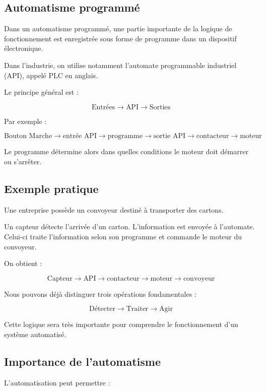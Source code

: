 \documentclass[12pt,a4paper]{book}
\begin{document}
\subsection{Automatisme programmé}

Dans un automatisme programmé, une partie importante de la logique de fonctionnement est enregistrée sous forme de programme dans un dispositif électronique.

Dans l'industrie, on utilise notamment l'automate programmable industriel (API), appelé PLC en anglais.

Le principe général est :

\[
\text{Entrées} \rightarrow \text{API} \rightarrow \text{Sorties}
\]

Par exemple :

\[
\text{Bouton Marche} \rightarrow \text{entrée API} \rightarrow \text{programme} \rightarrow \text{sortie API} \rightarrow \text{contacteur} \rightarrow \text{moteur}
\]

Le programme détermine alors dans quelles conditions le moteur doit démarrer ou s'arrêter.

\subsection{Exemple pratique}

Une entreprise possède un convoyeur destiné à transporter des cartons.

Un capteur détecte l'arrivée d'un carton. L'information est envoyée à l'automate. Celui-ci traite l'information selon son programme et commande le moteur du convoyeur.

On obtient :

\[
\text{Capteur} \rightarrow \text{API} \rightarrow \text{contacteur} \rightarrow \text{moteur} \rightarrow \text{convoyeur}
\]

Nous pouvons déjà distinguer trois opérations fondamentales :

\[
\text{Détecter} \rightarrow \text{Traiter} \rightarrow \text{Agir}
\]

Cette logique sera très importante pour comprendre le fonctionnement d'un système automatisé.

\subsection{Importance de l'automatisme}

L'automatisation peut permettre :
\end{document}

